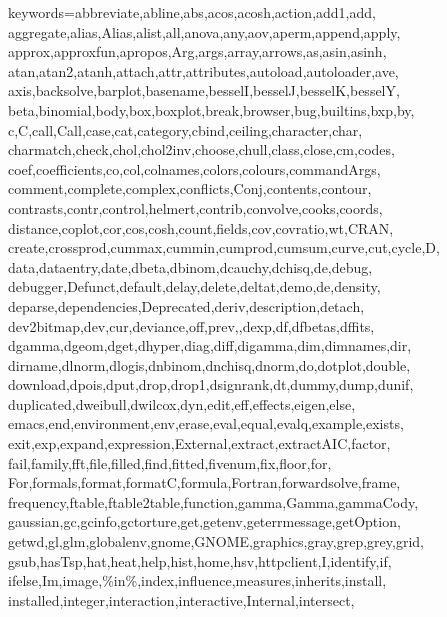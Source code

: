 \setlength{\epigraphwidth}{0.5\textwidth}
\setlength{\epigraphrule}{0pt}

\def\zz{\ifx\[$\else\aftergroup\zzz\fi}
\def\zzz{\setbox0\lastbox
	\dimen0\dimexpr\extrarowheight + \ht0-\dp0\relax
	\setbox0\hbox{\raise-.5\dimen0\box0}%
	\ht0=\dimexpr\ht0+\extrarowheight\relax
	\dp0=\dimexpr\dp0+\extrarowheight\relax
	\box0
}

%
{keywords={abbreviate,abline,abs,acos,acosh,action,add1,add,%
		aggregate,alias,Alias,alist,all,anova,any,aov,aperm,append,apply,%
		approx,approxfun,apropos,Arg,args,array,arrows,as,asin,asinh,%
		atan,atan2,atanh,attach,attr,attributes,autoload,autoloader,ave,%
		axis,backsolve,barplot,basename,besselI,besselJ,besselK,besselY,%
		beta,binomial,body,box,boxplot,break,browser,bug,builtins,bxp,by,%
		c,C,call,Call,case,cat,category,cbind,ceiling,character,char,%
		charmatch,check,chol,chol2inv,choose,chull,class,close,cm,codes,%
		coef,coefficients,co,col,colnames,colors,colours,commandArgs,%
		comment,complete,complex,conflicts,Conj,contents,contour,%
		contrasts,contr,control,helmert,contrib,convolve,cooks,coords,%
		distance,coplot,cor,cos,cosh,count,fields,cov,covratio,wt,CRAN,%
		create,crossprod,cummax,cummin,cumprod,cumsum,curve,cut,cycle,D,%
		data,dataentry,date,dbeta,dbinom,dcauchy,dchisq,de,debug,%
		debugger,Defunct,default,delay,delete,deltat,demo,de,density,%
		deparse,dependencies,Deprecated,deriv,description,detach,%
		dev2bitmap,dev,cur,deviance,off,prev,,dexp,df,dfbetas,dffits,%
		dgamma,dgeom,dget,dhyper,diag,diff,digamma,dim,dimnames,dir,%
		dirname,dlnorm,dlogis,dnbinom,dnchisq,dnorm,do,dotplot,double,%
		download,dpois,dput,drop,drop1,dsignrank,dt,dummy,dump,dunif,%
		duplicated,dweibull,dwilcox,dyn,edit,eff,effects,eigen,else,%
		emacs,end,environment,env,erase,eval,equal,evalq,example,exists,%
		exit,exp,expand,expression,External,extract,extractAIC,factor,%
		fail,family,fft,file,filled,find,fitted,fivenum,fix,floor,for,%
		For,formals,format,formatC,formula,Fortran,forwardsolve,frame,%
		frequency,ftable,ftable2table,function,gamma,Gamma,gammaCody,%
		gaussian,gc,gcinfo,gctorture,get,getenv,geterrmessage,getOption,%
		getwd,gl,glm,globalenv,gnome,GNOME,graphics,gray,grep,grey,grid,%
		gsub,hasTsp,hat,heat,help,hist,home,hsv,httpclient,I,identify,if,%
		ifelse,Im,image,\%in\%,index,influence,measures,inherits,install,%
		installed,integer,interaction,interactive,Internal,intersect,%
}}
